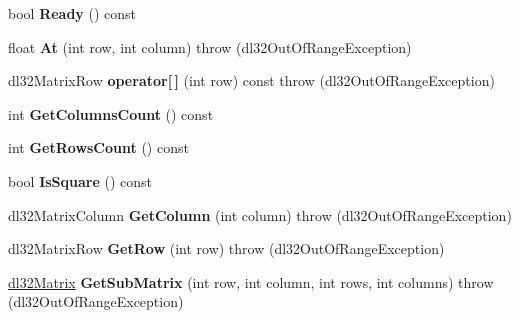 \begin{DoxyCompactItemize}
\item 
\hypertarget{classdl32_matrix_a8e0258d4aa4398b5dc1a14ddf496b24a}{bool {\bfseries Ready} () const }\label{classdl32_matrix_a8e0258d4aa4398b5dc1a14ddf496b24a}

\item 
\hypertarget{classdl32_matrix_a700d580e04b245039cac740d7333dff8}{float {\bfseries At} (int row, int column)  throw (dl32\-Out\-Of\-Range\-Exception)}\label{classdl32_matrix_a700d580e04b245039cac740d7333dff8}

\item 
\hypertarget{classdl32_matrix_a43493e7328b92d94b32ab7a0c7056486}{dl32\-Matrix\-Row {\bfseries operator\mbox{[}$\,$\mbox{]}} (int row) const   throw (dl32\-Out\-Of\-Range\-Exception)}\label{classdl32_matrix_a43493e7328b92d94b32ab7a0c7056486}

\item 
\hypertarget{classdl32_matrix_a19ff2641e2b4a43297e1e7901fbcc9f2}{int {\bfseries Get\-Columns\-Count} () const }\label{classdl32_matrix_a19ff2641e2b4a43297e1e7901fbcc9f2}

\item 
\hypertarget{classdl32_matrix_a6ca98a30c9a89112eea752bf1507aa2d}{int {\bfseries Get\-Rows\-Count} () const }\label{classdl32_matrix_a6ca98a30c9a89112eea752bf1507aa2d}

\item 
\hypertarget{classdl32_matrix_ac9b93f5e703cd23103d51c89e498b05c}{bool {\bfseries Is\-Square} () const }\label{classdl32_matrix_ac9b93f5e703cd23103d51c89e498b05c}

\item 
\hypertarget{classdl32_matrix_a3e83985b28ca837546838782b227d979}{dl32\-Matrix\-Column {\bfseries Get\-Column} (int column)  throw (dl32\-Out\-Of\-Range\-Exception)}\label{classdl32_matrix_a3e83985b28ca837546838782b227d979}

\item 
\hypertarget{classdl32_matrix_a1bc5136051dd24e091a7fc32f1869d3b}{dl32\-Matrix\-Row {\bfseries Get\-Row} (int row)  throw (dl32\-Out\-Of\-Range\-Exception)}\label{classdl32_matrix_a1bc5136051dd24e091a7fc32f1869d3b}

\item 
\hypertarget{classdl32_matrix_af7e62c774666a531abdefd477a313701}{\hyperlink{classdl32_matrix}{dl32\-Matrix} {\bfseries Get\-Sub\-Matrix} (int row, int column, int rows, int columns)  throw (dl32\-Out\-Of\-Range\-Exception)}\label{classdl32_matrix_af7e62c774666a531abdefd477a313701}


\end{DoxyCompactItemize}

